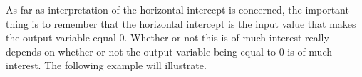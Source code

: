 As far as interpretation of the horizontal intercept is concerned, the important thing is to remember that the horizontal intercept is the input value that makes the output variable equal $0$. Whether or not this is of much interest really depends on whether or not the output variable being equal to $0$ is of much interest. The following example will illustrate.


